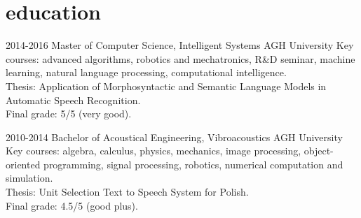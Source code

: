 \documentclass[]{friggeri-cv_osx}
\begin{document}

\begin{center}
\href{http:sebastiandziadzio.com}{\color{gray} \Large \faHome} \hspace{0.05cm}
\href{https://github.com/sebastiandziadzio}{\color{gray} \Large \faGithub} \hspace{0.05cm}
\href{mailto:sebastian.dziadzio@gmail.com}{\color{gray} \Large\faEnvelope} \hspace{0.05cm}
\href{https://twitter.com/sebadzia}{\color{gray} \Large\faTwitter} \hspace{0.05cm}
\href{http://pl.linkedin.com/in/sebastiandziadzio}{\color{gray} \Large\faLinkedin} \hspace{0.05cm}
\end{center}

\section{education}
\begin{entrylist}
\entry
{2014-2016}
{Master of Computer Science, Intelligent Systems}
{AGH University}
{Key courses: advanced algorithms, robotics and mechatronics, R\&D seminar, machine learning, natural language processing, computational intelligence.\\
Thesis: Application of Morphosyntactic and Semantic Language Models in Automatic Speech Recognition.\\
Final grade: 5/5 (very good).\\}

\entry
{2010-2014}
{Bachelor of Acoustical Engineering, Vibroacoustics}
{AGH University}
{Key courses: algebra, calculus, physics, mechanics, image processing, object-oriented programming, signal processing, robotics, numerical computation and simulation.\\
Thesis: Unit Selection Text to Speech System for Polish.\\
Final grade: 4.5/5 (good plus).\\}

\end{entrylist}
\end{document}
